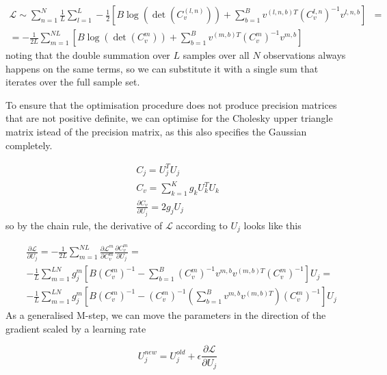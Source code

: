 \documentclass{paper}
\begin{document}
\begin{equation}
\begin{split}
\mathcal{L} \sim \sum_{n=1}^N \frac{1}{L} \sum_{l=1}^L -\frac{1}{2} \left[B \log \left( \det \left( C_v^{(l,n)} \right) \right) + \sum_{b=1}^B v^{(l,n,b)T}  \left( C_v^{l,n} \right)^{-1} v^{l,n,b}\right]& = \\
= -\frac{1}{2L} \sum_{m=1}^{NL} \left[B \log \left( \det \left( C_v^{m} \right) \right) + \sum_{b=1}^B v^{(m,b)T}  \left( C_v^{m} \right)^{-1} v^{m,b}\right]&
\end{split}
\end{equation}
%
noting that the double summation over $L$ samples over all $N$ observations always happens on the same terms, so we can substitute it with a single sum that iterates over the full sample set.

To ensure that the optimisation procedure does not produce precision matrices that are not positive definite, we can optimise for the Cholesky upper triangle matrix istead of the precision matrix, as this also specifies the Gaussian completely.

\begin{eqnarray}
C_j = U_j^T U_j \\
C_v = \sum_{k=1}^K g_k U_k^T U_k \\
\frac{\partial C_v}{\partial U_j} = 2 g_j U_j
\end{eqnarray}
%
so by the chain rule, the derivative of $\mathcal{L}$ according to $U_j$ looks like this

\begin{equation}
\begin{split}
&\frac{\partial \mathcal{L}}{\partial U_j} = -\frac{1}{2L} \sum_{m=1}^{NL} \frac{\partial \mathcal{L}^m}{\partial C_v^m} \frac{\partial C_v^m}{\partial U_j} = \\
& -\frac{1}{L} \sum_{m=1}^{LN} g_j^{m} \left[ B \left( C_v^m \right)^{-1} - \sum_{b=1}^B \left( C_v^m \right)^{-1} v^{m,b} v^{(m,b)T} \left( C_v^m \right)^{-1} \right] U_j = \\
& -\frac{1}{L} \sum_{m=1}^{LN} g_j^{m} \left[ B \left( C_v^m \right)^{-1} -  \left( C_v^m \right)^{-1} \left( \sum_{b=1}^B v^{m,b} v^{(m,b)T} \right) \left( C_v^m \right)^{-1} \right] U_j
\end{split}
\end{equation}
%
As a generalised M-step, we can move the parameters in the direction of the gradient scaled by a learning rate

\begin{equation}
U_j^{new} = U_j^{old} + \epsilon \frac{\partial \mathcal{L}}{\partial U_j}
\end{equation}
\end{document}
